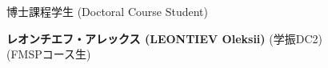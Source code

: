 \documentclass[a4j,twocolumn]{jarticle}
\begin{document}


博士課程学生 (Doctoral Course Student)



{\bf レオンチエフ・アレックス (LEONTIEV Oleksii)}
\hspace{3.85cm}(学振DC2)\\
\hspace{4.5cm}(FMSPコース生)

%
%
%
%
\end{document}
